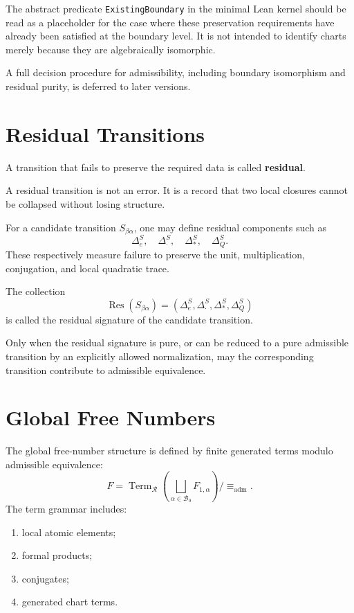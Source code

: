 \documentclass[11pt]{article}
\begin{document}
The abstract predicate \texttt{ExistingBoundary} in the minimal Lean kernel should be read as a placeholder for the case where these preservation requirements have already been satisfied at the boundary level. It is not intended to identify charts merely because they are algebraically isomorphic.

A full decision procedure for admissibility, including boundary isomorphism and residual purity, is deferred to later versions.

\section{Residual Transitions}
\label{sec:residual-transitions}

A transition that fails to preserve the required data is called \textbf{residual}.

A residual transition is not an error. It is a record that two local closures cannot be collapsed without losing structure.

For a candidate transition $S_{\beta\alpha}$, one may define residual components such as
\[
\Delta_e^S,\quad \Delta_\cdot^S,\quad \Delta_*^S,\quad \Delta_Q^S.
\]
These respectively measure failure to preserve the unit, multiplication, conjugation, and local quadratic trace.

The collection
\[
\operatorname{Res}(S_{\beta\alpha})=(\Delta_e^S,\Delta_\cdot^S,\Delta_*^S,\Delta_Q^S)
\]
is called the residual signature of the candidate transition.

Only when the residual signature is pure, or can be reduced to a pure admissible transition by an explicitly allowed normalization, may the corresponding transition contribute to admissible equivalence.

\section{Global Free Numbers}

The global free-number structure is defined by finite generated terms modulo admissible equivalence:
\[
F=\operatorname{Term}_{\mathcal R}\left(\bigsqcup_{\alpha\in\mathcal B_0}F_{1,\alpha}\right)/\equiv_{\mathrm{adm}}.
\]
The term grammar includes:
\begin{enumerate}
  \item local atomic elements;
  \item formal products;
  \item conjugates;
  \item generated chart terms.
\end{enumerate}
\end{document}
